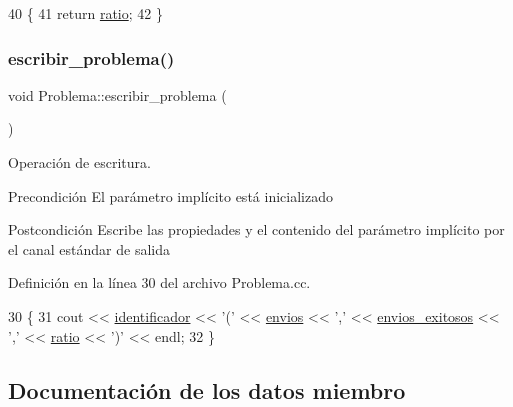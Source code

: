 \begin{DoxyCode}
40                            \{
41   \textcolor{keywordflow}{return} \mbox{\hyperlink{class_problema_acc3d2ce24418ad68650108de4b603d99}{ratio}};
42 \}
\end{DoxyCode}
\mbox{\label{class_problema_afbf19bc99df3c05b7baa3a138fb9e17d}} 
\subsubsection{\texorpdfstring{escribir\+\_\+problema()}{escribir\_problema()}}
{\footnotesize\ttfamily void Problema\+::escribir\+\_\+problema (\begin{DoxyParamCaption}{ }\end{DoxyParamCaption})}



Operación de escritura. 

\begin{DoxyPrecond}{Precondición}
El parámetro implícito está inicializado 
\end{DoxyPrecond}
\begin{DoxyPostcond}{Postcondición}
Escribe las propiedades y el contenido del parámetro implícito por el canal estándar de salida 
\end{DoxyPostcond}


Definición en la línea 30 del archivo Problema.\+cc.


\begin{DoxyCode}
30                                  \{
31   cout << \mbox{\hyperlink{class_problema_ac59427a22875e6b6a35490628a220ba6}{identificador}} << \textcolor{charliteral}{'('} << \mbox{\hyperlink{class_problema_aaef8dcb723fa829a052517a00aed003e}{envios}} << \textcolor{charliteral}{','} << 
      \mbox{\hyperlink{class_problema_ad8f0dfd65c2673395ad72ae9817cb7ae}{envios\_exitosos}} << \textcolor{charliteral}{','} << \mbox{\hyperlink{class_problema_acc3d2ce24418ad68650108de4b603d99}{ratio}} << \textcolor{charliteral}{')'} << endl;
32 \}
\end{DoxyCode}


\subsection{Documentación de los datos miembro}
\mbox{\label{class_problema_ac59427a22875e6b6a35490628a220ba6}} 
